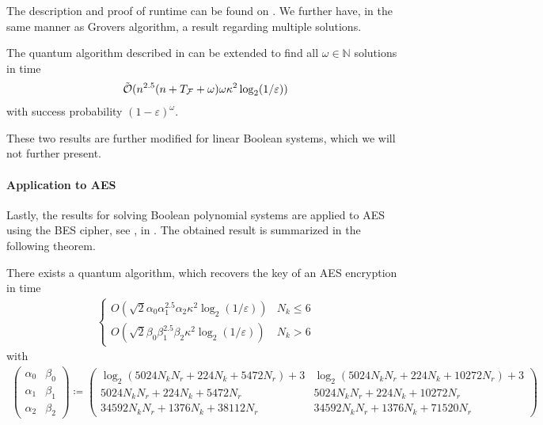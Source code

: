 The description and proof of runtime can be found on \cite[pp. 16-19]{Chen2017}. We further have, in the same manner as Grovers algorithm, a result regarding multiple solutions.

\begin{theorem}
    The quantum algorithm described in  can be extended to find all \(\omega \in \mathbb{N}\) solutions in time
    \begin{align}
        \tilde{\operatorname{\mathcal{O}}}(n^{2.5}(n+T_{\mathcal{F}}+\omega)\omega\kappa^2\log_2(1/\varepsilon))
    \end{align}
    with success probability \((1-\varepsilon)^{\omega}\).
\end{theorem}

These two results are further modified for linear Boolean systems, which we will not further present.

\paragraph*{Application to AES} Lastly, the results for solving Boolean polynomial systems are applied to AES using the BES cipher, see , in \cite[pp. 24-25, pp. 32-34]{Chen2017}. The obtained result is summarized in the following theorem.

\begin{theorem}
    There exists a quantum algorithm, which recovers the key of an AES encryption in time
    \begin{align}
        \begin{cases}
            O(\sqrt{2}\alpha_0\alpha_1^{2.5}\alpha_2\kappa^2\log_2(1/\varepsilon)) & N_k \leq 6\\
            O(\sqrt{2}\beta_0\beta_1^{2.5}\beta_2\kappa^2\log_2(1/\varepsilon)) & N_k > 6
        \end{cases}
    \end{align}
    with
    \begin{align}
        \begin{pmatrix}
            \alpha_0 & \beta_0\\
            \alpha_1 & \beta_1\\
            \alpha_2 & \beta_2
        \end{pmatrix} \coloneqq \begin{pmatrix}
            \log_2(5024N_kN_r+224N_k+5472N_r)+3 & \log_2(5024N_kN_r+224N_k+10272N_r)+3\\
            5024N_kN_r+224N_k+5472N_r & 5024N_kN_r+224N_k+10272N_r\\
            34592N_kN_r+1376N_k+38112N_r & 34592N_kN_r+1376N_k+71520N_r
        \end{pmatrix}
    \end{align}
\end{theorem}

